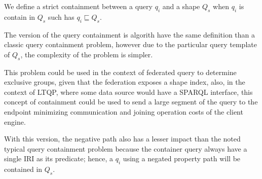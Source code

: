 \iffalse
LET MAKE AN ALGORITHM and analyse the complexity
\fi


\begin{definition}\label{def:strictContainment}
We define a strict containment between a query $q_i$ and a shape $Q_s$ when $q_i$ is contain in $Q_s$ such has $q_{i} \sqsubseteq Q_s$.
\end{definition}

The version of the query containment is algorith have the same definition than a classic query containment problem, however due to the 
particular query template of $Q_s$, the complexity of the problem is simpler.

This problem could be used in the context of federated query to determine exclusive groups, given that the federation exposes a shape index, 
also, in the context of LTQP, where some data source would have a SPARQL interface, this concept of containment could be used to send a large segment of the query to the endpoint 
minimizing communication and joining operation costs of the client engine.

With this version, the negative path also has a lesser impact than the noted typical query containment problem because the container query 
always have a single IRI as its predicate; hence, a $q_i$ using a negated property path will be contained in $Q_s$.

\iffalse
The query shape containment problem is similar to the query containment problem as it 
try to determine if the possible answers of the star pattern with dependencies query are contained in any instance of data respecting an RDF data shape.
We can divide the query shape contaiment problem into two category the \emph{strict} and \emph{loose} containment.
The difference between the problems lies into their handling of the union of queries, optional triple patterns and cardinality of property path.


We consider an RDF data shapes as start pattern with dependencies such as 
\begin{equation}
   Q_{shape} = Q_{body} \bigvee Q_{nested body}
\end{equation}
because the subject of a shape is always a single variable 

CITE FOR PROPERTY PATH PARTICULARLY THE NEGATION \cite{Kostylev2015}


The shape index by solving the query containment problem can be expressed as a structural assumption.
... define the algorithm
\fi
\fi